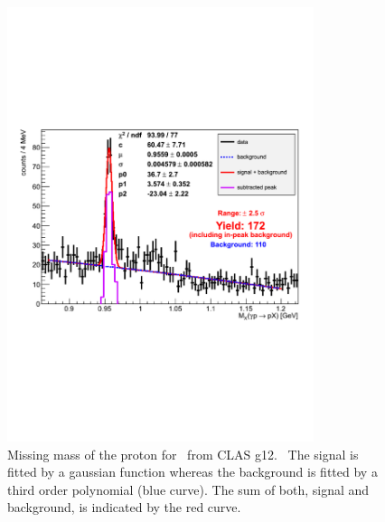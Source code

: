 \begin{figure}[h!]\begin{center}
		\includegraphics[width=0.8\textwidth]{figures/g12/etaPeeg_mimass.pdf}
		\caption[Counts rates for \etaTP from g12]{\label{fig:g12MxP}Missing mass of the proton for \etaPDal \  from CLAS g12.~\cite{thesisschever} The signal is fitted by a gaussian function whereas the background is fitted by a third order polynomial (blue curve). The sum of both, signal and background, is indicated by the red curve.}
	\end{center}\end{figure}


